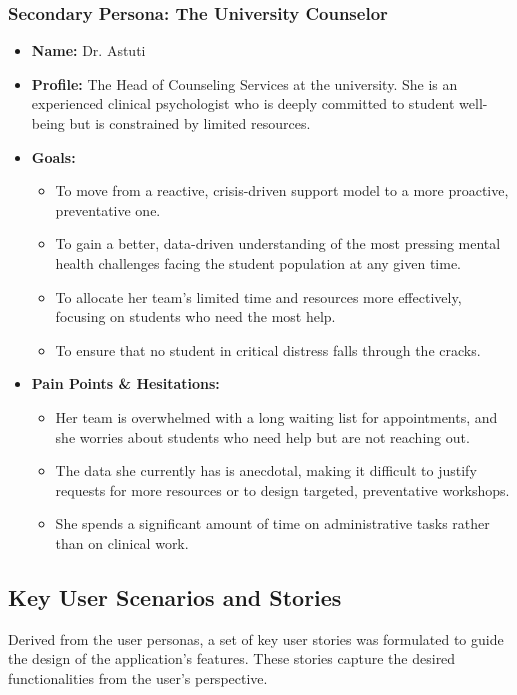 \subsubsection{Secondary Persona: The University Counselor}
\begin{itemize}
    \item \textbf{Name:} Dr. Astuti
    \item \textbf{Profile:} The Head of Counseling Services at the university. She is an experienced clinical psychologist who is deeply committed to student well-being but is constrained by limited resources.
    \item \textbf{Goals:}
        \begin{itemize}
            \item To move from a reactive, crisis-driven support model to a more proactive, preventative one.
            \item To gain a better, data-driven understanding of the most pressing mental health challenges facing the student population at any given time.
            \item To allocate her team's limited time and resources more effectively, focusing on students who need the most help.
            \item To ensure that no student in critical distress falls through the cracks.
        \end{itemize}
    \item \textbf{Pain Points \& Hesitations:}
        \begin{itemize}
            \item Her team is overwhelmed with a long waiting list for appointments, and she worries about students who need help but are not reaching out.
            \item The data she currently has is anecdotal, making it difficult to justify requests for more resources or to design targeted, preventative workshops.
            \item She spends a significant amount of time on administrative tasks rather than on clinical work.
        \end{itemize}
\end{itemize}

\subsection{Key User Scenarios and Stories}

Derived from the user personas, a set of key user stories was formulated to guide the design of the application's features. These stories capture the desired functionalities from the user's perspective.

